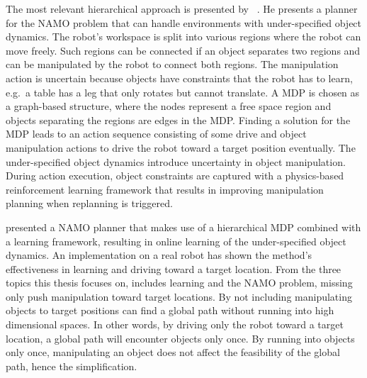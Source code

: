 The most relevant hierarchical approach is presented by \citeauthor{scholz_navigation_2016}~\cite{scholz_navigation_2016}. He presents a planner for the \ac{NAMO} problem that can handle environments with under-specified object dynamics. The robot's workspace is split into various regions where the robot can move freely. Such regions can be connected if an object separates two regions and can be manipulated by the robot to connect both regions. The manipulation action is uncertain because objects have constraints that the robot has to learn, e.g.~a table has a leg that only rotates but cannot translate. A \ac{MDP} is chosen as a graph-based structure, where the nodes represent a free space region and objects separating the regions are edges in the \ac{MDP}. Finding a solution for the \ac{MDP} leads to an action sequence consisting of some drive and object manipulation actions to drive the robot toward a target position eventually. The under-specified object dynamics introduce uncertainty in object manipulation. During action execution, object constraints are captured with a physics-based reinforcement learning framework that results in improving manipulation planning when replanning is triggered.\bs

\citeauthor{scholz_navigation_2016} presented a \ac{NAMO} planner that makes use of a hierarchical \ac{MDP} combined with a learning framework, resulting in online learning of the under-specified object dynamics. An implementation on a real robot has shown the method's effectiveness in learning and driving toward a target location. From the three topics this thesis focuses on, \citeauthor{scholz_navigation_2016} includes learning and the \ac{NAMO} problem, missing only push manipulation toward target locations. By not including manipulating objects to target positions \citeauthor{scholz_navigation_2016} can find a global path without running into high dimensional spaces. In other words, by driving only the robot toward a target location, a global path will encounter objects only once. By running into objects only once, manipulating an object does not affect the feasibility of the global path, hence the simplification.\bs


